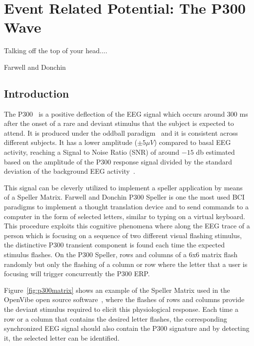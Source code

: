 \chapter{Event Related Potential: The P300 Wave}
\label{chapter:six}
\epigraph{Talking off the top of your head....}{Farwell and Donchin}

\section{Introduction}

The P300~\cite{Farwell1988,Knuth2006} is a positive deflection of the EEG signal which occurs around $300$ ms after the onset of a rare and deviant stimulus that the subject is expected to attend.  It is produced under the oddball paradigm~\cite{WolpawJonathanR2012} and it is consistent across different subjects. It has a lower amplitude  ($\pm 5 \mu V $) compared to basal EEG activity, reaching a Signal to Noise Ratio (SNR) of around $-15$ db estimated based on the amplitude of the P300 response signal divided by the standard deviation of the background EEG activity~\cite{Hu2010}.  

This signal can be cleverly utilized to implement a speller application by means of a Speller Matrix. Farwell and Donchin P300 Speller \cite{Farwell1988} is one the most used BCI paradigms to implement a thought translation device and to send commands to a computer in the form of selected letters, similar to typing on a virtual keyboard.  This procedure exploits this cognitive phenomena where along the EEG trace of a person which is focusing on a sequence of two different visual flashing stimulus, the distinctive P300 transient component is found each time the expected stimulus flashes.  On the P300 Speller, rows and columns of a 6x6 matrix flash randomly but only the flashing of a column or row where the letter that a user is focusing will trigger concurrently the P300 ERP.

Figure~\ref{fig:p300matrix} shows an example of the Speller Matrix used in the OpenVibe open source software~\cite{Renard2010}, where the flashes of rows and columns provide the deviant stimulus required to elicit this physiological response.   Each time a row or a column that contains the desired letter flashes, the corresponding synchronized EEG signal should also contain the P300 signature and by detecting it, the selected letter can be identified.

